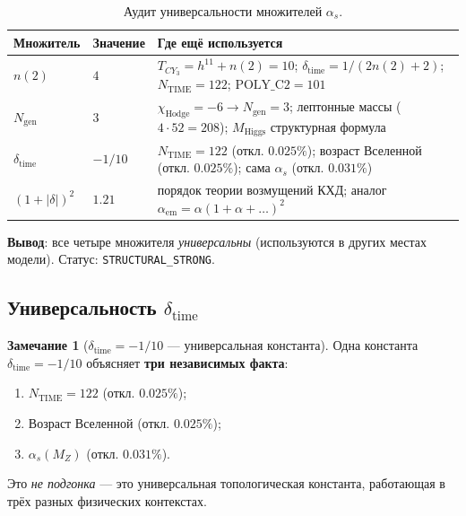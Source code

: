 \documentclass[11pt,a4paper]{article}
\newcommand{\CY}{\ensuremath{CY_3}}
\newcommand{\Ngen}{\ensuremath{N_{\text{gen}}}}
\theoremstyle{definition}
\newtheorem{remark}[theorem]{Замечание}
\begin{document}
\begin{table}[ht]
\centering
\caption{Аудит универсальности множителей \texorpdfstring{$\alpha_s$}{\_s}.}
\label{tab:alphas-audit}
\begin{tabular}{p{2.5cm}p{2cm}p{7cm}}
\toprule
Множитель & Значение & Где ещё используется \\
\midrule
$n(2)$ & $4$ &
    $T_{\CY} = h^{11} + n(2) = 10$;
    $\delta_{\text{time}} = 1/(2n(2)+2)$;
    $N_{\text{TIME}} = 122$;
    $\text{POLY\_C2} = 101$ \\[0.3em]
$\Ngen$ & $3$ &
    $\chi_{\text{Hodge}} = -6 \to \Ngen = 3$;
    лептонные массы ($4 \cdot 52 = 208$);
    $M_{\text{Higgs}}$ структурная формула \\[0.3em]
$\delta_{\text{time}}$ & $-1/10$ &
    $N_{\text{TIME}} = 122$ (откл. $0.025\%$);
    возраст Вселенной (откл. $0.025\%$);
    сама $\alpha_s$ (откл. $0.031\%$) \\[0.3em]
$(1+|\delta|)^2$ & $1.21$ &
    порядок теории возмущений КХД;
    аналог $\alpha_{\text{em}} = \alpha(1 + \alpha + \ldots)^2$ \\
\bottomrule
\end{tabular}
\end{table}

\medskip\noindent
\textbf{Вывод}: все четыре множителя \emph{универсальны}
(используются в других местах модели). Статус:
\texttt{STRUCTURAL\_STRONG}.

\subsection{Универсальность \texorpdfstring{$\delta_{\text{time}}$}{delta\_time}}
\label{subsec:alphas-delta-time}

\begin{remark}[$\delta_{\text{time}} = -1/10$ — универсальная константа]
\label{rem:delta-time-universal}
Одна константа $\delta_{\text{time}} = -1/10$ объясняет
\textbf{три независимых факта}:
\begin{enumerate}
    \item $N_{\text{TIME}} = 122$ (откл. $0.025\%$);
    \item Возраст Вселенной (откл. $0.025\%$);
    \item $\alpha_s(M_Z)$ (откл. $0.031\%$).
\end{enumerate}
Это \emph{не подгонка} — это универсальная топологическая
константа, работающая в трёх разных физических контекстах.
\end{remark}
\end{document}
